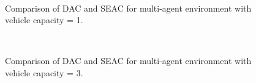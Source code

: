 \documentclass{article}
\theoremstyle{defn}
\theoremstyle{prop}
\theoremstyle{assm}
\theoremstyle{theoremm}
\theoremstyle{remarkk}
\theoremstyle{lem}
\theoremstyle{example}
\theoremstyle{example}
\begin{document}
\captionsetup[figure]{belowskip=-4pt}
\begin{figure}
  \centering
  \captionsetup[subfigure]{aboveskip=-5pt,belowskip=-2pt}
  \begin{subfigure}[b]{0.49\textwidth}
  \centering
  
  \caption*{}
  \label{fig:TvsTstep}
  \end{subfigure}
	\ 
  \begin{subfigure}[b]{0.49\textwidth}
  \centering
  
  \caption*{}
  \label{fig:TvsNstep}
  \end{subfigure}
  \caption{Comparison of DAC and SEAC for multi-agent environment with vehicle capacity = 1.}
\end{figure}
\captionsetup[figure]{belowskip=-4pt}
\begin{figure}
  \centering
  \captionsetup[subfigure]{aboveskip=-5pt,belowskip=-2pt}
  \begin{subfigure}[b]{0.49\textwidth}
  \centering
  
  \caption*{}
  \label{fig:TvsTstep}
  \end{subfigure}
	\ 
  \begin{subfigure}[b]{0.49\textwidth}
  \centering
  
  \caption*{}
  \label{fig:TvsNstep}
  \end{subfigure}
  \caption{Comparison of DAC and SEAC for multi-agent environment with vehicle capacity = 3.}
\end{figure}

\clearpage

\end{document}
